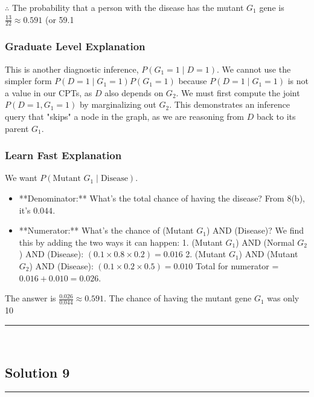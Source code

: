 \documentclass{article}
\begin{document}
{{\subsubsection*{\normalfont}{$\therefore$ The probability that a person with the disease has the mutant $G_1$ gene is $\frac{13}{22} \approx 0.591$ (or 59.1%

\subsubsection*{Graduate Level Explanation}
This is another diagnostic inference, $P(G_1=1 \mid D=1)$. We cannot use the simpler form $P(D=1 \mid G_1=1)P(G_1=1)$ because $P(D=1 \mid G_1=1)$ is not a value in our CPTs, as $D$ also depends on $G_2$. We must first compute the joint $P(D=1, G_1=1)$ by marginalizing out $G_2$. This demonstrates an inference query that "skips" a node in the graph, as we are reasoning from $D$ back to its parent $G_1$.

\subsubsection*{Learn Fast Explanation}
We want $P(\text{Mutant } G_1 \mid \text{Disease})$.
\begin{itemize}
    \item **Denominator:** What's the total chance of having the disease? From 8(b), it's $0.044$.
    \item **Numerator:** What's the chance of (Mutant $G_1$) AND (Disease)? We find this by adding the two ways it can happen:
        1. (Mutant $G_1$) AND (Normal $G_2$) AND (Disease): $(0.1 \times 0.8 \times 0.2) = 0.016$
        2. (Mutant $G_1$) AND (Mutant $G_2$) AND (Disease): $(0.1 \times 0.2 \times 0.5) = 0.010$
        Total for numerator = $0.016 + 0.010 = 0.026$.
\end{itemize}
The answer is $\frac{0.026}{0.044} \approx 0.591$.
The chance of having the mutant gene $G_1$ was only 10%

\noindent\rule{\textwidth}{0.4pt}\\

\newpage
\newpage

\subsection*{Solution 9}
\noindent\rule{\textwidth}{0.4pt}\\
}}}
\end{document}
